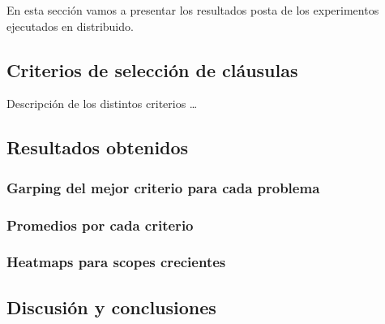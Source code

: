 En esta sección vamos a presentar los resultados posta de los experimentos
ejecutados en distribuido.

\subsection{Criterios de selección de cláusulas}

Descripción de los distintos criterios \ldots

\subsection{Resultados obtenidos}

\subsubsection{Garping del mejor criterio para cada problema}

\subsubsection{Promedios por cada criterio}

\subsubsection{Heatmaps para scopes crecientes}


\subsection{Discusión y conclusiones}


\newpage

